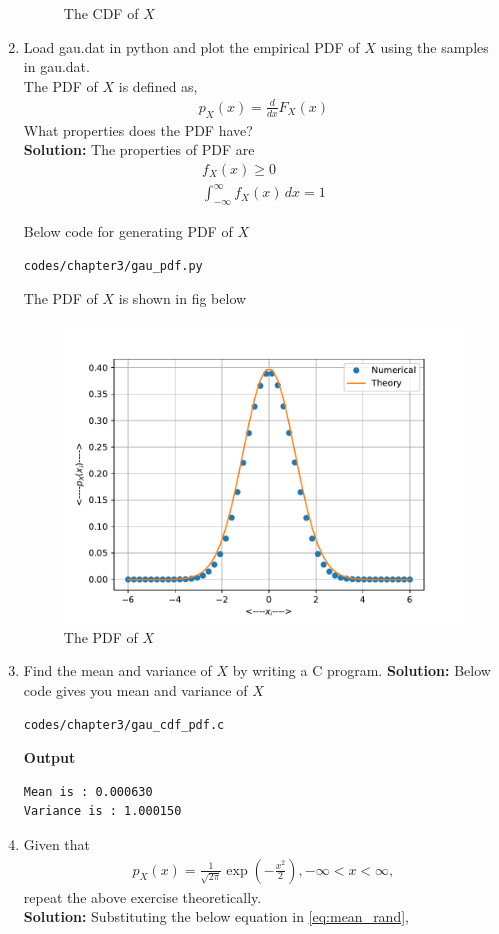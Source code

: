 \documentclass[journal,15pt,twocolumn]{IEEEtran}
\providecommand{\brak}[1]{\ensuremath{\left(#1\right)}}
\newcommand{\solution}{\noindent \textbf{Solution: }}
\begin{document}
\begin{enumerate}
\begin{figure}[H]
\caption{The CDF of $X$}
\label{fig:gauss_cdf}
\end{figure}

\item
Load gau.dat in python and plot the empirical PDF of $X$ using the samples in gau.dat. \\The PDF of $X$ is defined as,
\begin{align}
p_{X}(x) = \frac{d}{dx}F_{X}(x)
\label{eq:cdf_to_pdf}
\end{align}
What properties does the PDF have?
\\
\solution The properties of PDF are
\begin{eqnarray}
	f_X(x) \ge 0\\
	\int_{-\infty}^{\infty} f_X(x) \,dx = 1
\end{eqnarray}

Below code for generating PDF of $X$
\begin{lstlisting}
codes/chapter3/gau_pdf.py
\end{lstlisting}
The PDF of $X$ is shown in fig below
\begin{figure}[H]
\centering
\includegraphics[width=\columnwidth]{./figs/chapter3/gau_pdf.pdf}
\caption{The PDF of $X$}
\label{fig:gauss_pdf}
\end{figure}

\item Find the mean and variance of $X$ by writing a C program.
\solution Below code gives you mean and variance of $X$
\begin{lstlisting}
codes/chapter3/gau_cdf_pdf.c
\end{lstlisting}
\textbf{Output} 
\begin{lstlisting}
Mean is : 0.000630
Variance is : 1.000150
\end{lstlisting}
\item Given that 
\begin{align}
p_{X}(x) = \frac{1}{\sqrt{2\pi}}\exp\brak{-\frac{x^2}{2}}, -\infty < x < \infty,
\end{align}
repeat the above exercise theoretically.\\
\solution Substituting the below equation in \eqref{eq:mean_rand},


\end{enumerate}
\end{document}

